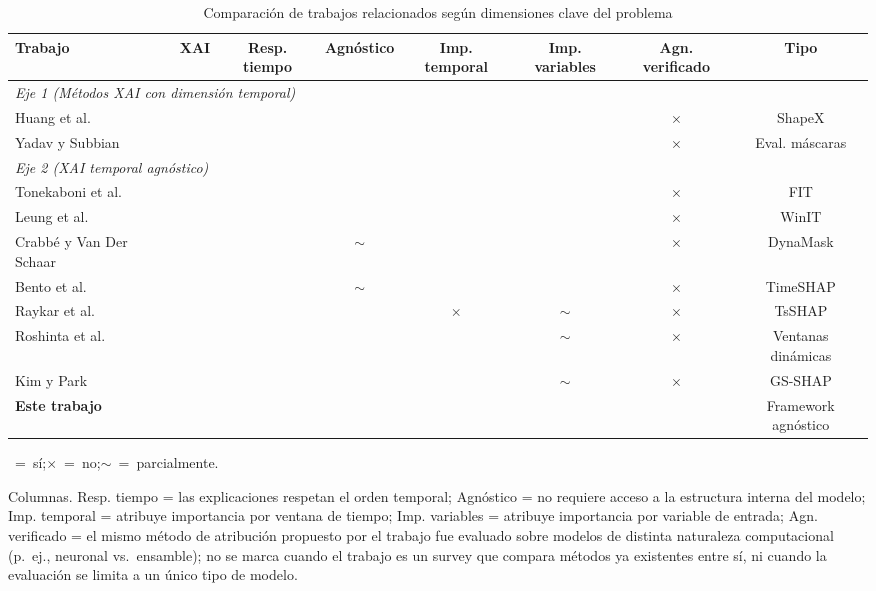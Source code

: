 \documentclass[conference, letterpaper]{IEEEtran}
\newcommand{\cmark}{\checkmark}
\newcommand{\xmark}{$\times$}
\begin{document}
\begin{table}[ht]
\centering
\caption{Comparación de trabajos relacionados según 
dimensiones clave del problema}
\label{tab:trabajos_relacionados}
\scriptsize
\setlength{\tabcolsep}{4pt}
\begin{tabular}{lccccccc}
\toprule
\textbf{Trabajo} & 
\textbf{XAI} & 
\textbf{Resp. tiempo} & 
\textbf{Agnóstico} & 
\textbf{Imp. temporal} & 
\textbf{Imp. variables} & 
\textbf{Agn. verificado} & 
\textbf{Tipo} \\
\midrule
\multicolumn{8}{l}{\textit{Eje 1 (Métodos XAI con dimensión temporal)}} \\
\midrule
Huang et al.~\cite{huang2025}
& \cmark & \cmark & \cmark & \cmark & \cmark & \xmark 
& ShapeX \\
Yadav y Subbian~\cite{yadav2025}  
& \cmark & \cmark & \cmark & \cmark & \cmark & \xmark 
& Eval. máscaras \\
\midrule
\multicolumn{8}{l}{\textit{Eje 2 (XAI temporal agnóstico)}} \\
\midrule
Tonekaboni et al.~\cite{tonekaboni2020}  
& \cmark & \cmark & \cmark & \cmark & \cmark & \xmark 
& FIT \\
Leung et al.~\cite{leung2023winit}  
& \cmark & \cmark & \cmark & \cmark & \cmark & \xmark 
& WinIT \\
Crabbé y Van Der Schaar~\cite{crabbe2021}  
& \cmark & \cmark & $\sim$ & \cmark & \cmark & \xmark 
& DynaMask \\
Bento et al.~\cite{bento2021}
& \cmark & \cmark & $\sim$ & \cmark & \cmark & \xmark
& TimeSHAP \\
Raykar et al.~\cite{raykar2023}
& \cmark & \cmark & \cmark & \xmark & $\sim$ & \xmark
& TsSHAP \\
Roshinta et al.~\cite{roshinta2026}
& \cmark & \cmark & \cmark & \cmark & $\sim$ & \xmark
& Ventanas dinámicas \\
Kim y Park~\cite{gsshap2026}
& \cmark & \cmark & \cmark & \cmark & $\sim$ & \xmark
& GS-SHAP \\
\midrule
\textbf{Este trabajo}  
& \cmark & \cmark & \cmark & \cmark & \cmark & \cmark 
& Framework agnóstico \\
\bottomrule
\end{tabular}
\begin{tablenotes}
\small
\item \cmark~=~sí;\quad \xmark~=~no;\quad $\sim$~=~parcialmente.
\item Columnas.
Resp. tiempo = las explicaciones respetan el orden temporal;
Agnóstico = no requiere acceso a la estructura interna del 
modelo; 
Imp. temporal = atribuye importancia por ventana de tiempo; 
Imp. variables = atribuye importancia por variable de 
entrada; 
Agn. verificado = el mismo método de atribución propuesto por 
el trabajo fue evaluado sobre modelos de distinta naturaleza 
computacional (p.\ ej., neuronal vs.\ ensamble); no se marca 
cuando el trabajo es un survey que compara métodos ya 
existentes entre sí, ni cuando la evaluación se limita a un 
único tipo de modelo.
\end{tablenotes}
\end{table}
\end{document}
